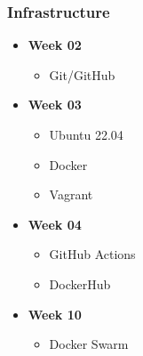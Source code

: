\subsubsection*{Infrastructure}
\begin{itemize}
    \item \textbf{Week 02}
    \begin{itemize}
        \item Git/GitHub
    \end{itemize}
    \item \textbf{Week 03}
    \begin{itemize}
        \item Ubuntu 22.04
        \item Docker
        \item Vagrant
    \end{itemize}
        \item \textbf{Week 04}
    \begin{itemize}
        \item GitHub Actions
        \item DockerHub
    \end{itemize}
        \item \textbf{Week 10}
    \begin{itemize}
        \item Docker Swarm
    \end{itemize}
\end{itemize}

